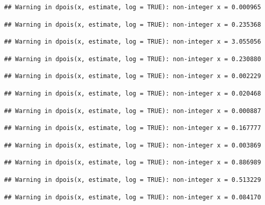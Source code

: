 \documentclass[]{article}
\begin{document}
\begin{verbatim}
## Warning in dpois(x, estimate, log = TRUE): non-integer x = 0.000965
\end{verbatim}

\begin{verbatim}
## Warning in dpois(x, estimate, log = TRUE): non-integer x = 0.235368
\end{verbatim}

\begin{verbatim}
## Warning in dpois(x, estimate, log = TRUE): non-integer x = 3.055056
\end{verbatim}

\begin{verbatim}
## Warning in dpois(x, estimate, log = TRUE): non-integer x = 0.230880
\end{verbatim}

\begin{verbatim}
## Warning in dpois(x, estimate, log = TRUE): non-integer x = 0.002229
\end{verbatim}

\begin{verbatim}
## Warning in dpois(x, estimate, log = TRUE): non-integer x = 0.020468
\end{verbatim}

\begin{verbatim}
## Warning in dpois(x, estimate, log = TRUE): non-integer x = 0.000887
\end{verbatim}

\begin{verbatim}
## Warning in dpois(x, estimate, log = TRUE): non-integer x = 0.167777
\end{verbatim}

\begin{verbatim}
## Warning in dpois(x, estimate, log = TRUE): non-integer x = 0.003869
\end{verbatim}

\begin{verbatim}
## Warning in dpois(x, estimate, log = TRUE): non-integer x = 0.886989
\end{verbatim}

\begin{verbatim}
## Warning in dpois(x, estimate, log = TRUE): non-integer x = 0.513229
\end{verbatim}

\begin{verbatim}
## Warning in dpois(x, estimate, log = TRUE): non-integer x = 0.084170
\end{verbatim}
\end{document}
